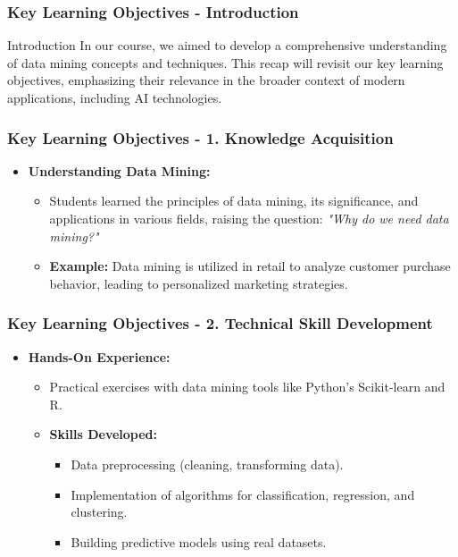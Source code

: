 \documentclass[aspectratio=169]{beamer}
\begin{document}
\begin{frame}[fragile]
    \frametitle{Key Learning Objectives - Introduction}
    \begin{block}{Introduction}
        In our course, we aimed to develop a comprehensive understanding of data mining concepts and techniques. This recap will revisit our key learning objectives, emphasizing their relevance in the broader context of modern applications, including AI technologies.
    \end{block}
\end{frame}

\begin{frame}[fragile]
    \frametitle{Key Learning Objectives - 1. Knowledge Acquisition}
    \begin{itemize}
        \item \textbf{Understanding Data Mining:} 
        \begin{itemize}
            \item Students learned the principles of data mining, its significance, and applications in various fields, raising the question: 
            \textit{"Why do we need data mining?"}
            \item \textbf{Example:} Data mining is utilized in retail to analyze customer purchase behavior, leading to personalized marketing strategies.
        \end{itemize}
    \end{itemize}
\end{frame}

\begin{frame}[fragile]
    \frametitle{Key Learning Objectives - 2. Technical Skill Development}
    \begin{itemize}
        \item \textbf{Hands-On Experience:}
        \begin{itemize}
            \item Practical exercises with data mining tools like Python's Scikit-learn and R.
            \item \textbf{Skills Developed:}
            \begin{itemize}
                \item Data preprocessing (cleaning, transforming data).
                \item Implementation of algorithms for classification, regression, and clustering.
                \item Building predictive models using real datasets.
            \end{itemize}
        \end{itemize}
    \end{itemize}
\end{frame}
\end{document}
